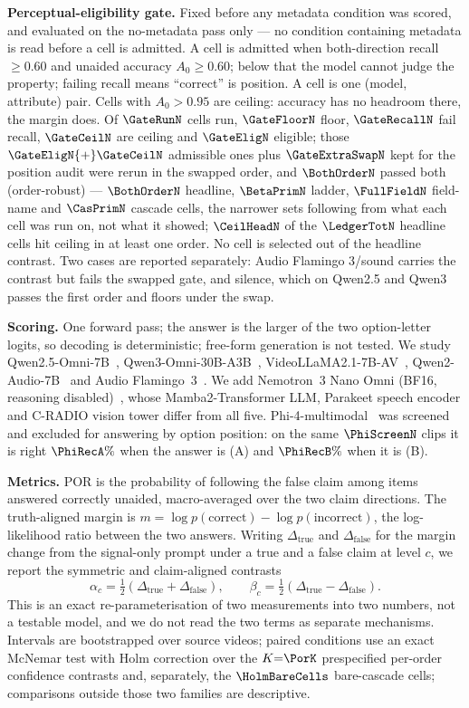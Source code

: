 \noindent\textbf{Perceptual-eligibility gate.} Fixed before any metadata condition was
scored, and evaluated on the
no-metadata pass only --- no condition containing metadata is read before a cell is
admitted. A cell is admitted when both-direction recall $\ge0.60$ and
unaided accuracy $A_0\ge0.60$; below that the model cannot judge the property; failing
recall means ``correct'' is position. A cell is one (model, attribute) pair. Cells with $A_0>0.95$ are ceiling: accuracy has no headroom
there, the margin does. Of $\GateRunN$ cells run, $\GateFloorN$ floor,
$\GateRecallN$ fail recall, $\GateCeilN$ are ceiling and $\GateEligN$ eligible; those
$\GateEligN{+}\GateCeilN$ admissible ones plus $\GateExtraSwapN$ kept for the position audit were
rerun in the swapped order, and $\BothOrderN$ passed both (order-robust) --- $\BothOrderN$ headline, $\BetaPrimN$
ladder, $\FullFieldN$ field-name and $\CasPrimN$ cascade cells, the narrower sets following from
what each cell was run on, not what it showed; $\CeilHeadN$ of the $\LedgerTotN$ headline cells hit ceiling in at least one order. No cell is selected out of the headline contrast. Two cases are
reported separately: Audio Flamingo 3/sound carries the contrast but fails the swapped gate, and
silence, which on Qwen2.5 and Qwen3 passes the first order and floors under the swap.

\noindent\textbf{Scoring.} One forward pass; the answer is the larger of the two option-letter
logits, so decoding is deterministic; free-form generation is not tested. We study
Qwen2.5-Omni-7B~\cite{qwen25omni}, Qwen3-\-Omni-\-30B-\-A3B~\cite{qwen3omni},
Video\-LLaMA2.1-\-7B-\-AV~\cite{cheng2024videollama2}, Qwen2-Audio-7B~\cite{qwen2audio} and Audio Flamingo~3~\cite{af3}. We add Nemotron~3 Nano Omni
(BF16, reasoning disabled)~\cite{nvidia2026nemotronomni}, whose Mamba2-\-Trans\-former LLM, Parakeet speech encoder and C-RADIO vision tower differ from all five. Phi-4-multi\-modal~\cite{phi4mm} was screened and excluded for answering by option position: on the same $\PhiScreenN$ clips it is right $\PhiRecA\%$ when the answer is (A) and $\PhiRecB\%$ when it is (B).



\noindent\textbf{Metrics.} POR is the probability of following the false claim among items
answered correctly unaided, macro-averaged over the two claim directions. The truth-aligned
margin is $m=\log p(\text{correct})-\log p(\text{incorrect})$, the log-likelihood ratio
between the two answers. Writing $\Delta_{\text{true}}$
and $\Delta_{\text{false}}$ for the margin change from the signal-only prompt under a true and a false claim at level $c$,
we report the symmetric and claim-aligned contrasts
\[
\alpha_c=\tfrac{1}{2}(\Delta_{\text{true}}+\Delta_{\text{false}}),\qquad
\beta_c=\tfrac{1}{2}(\Delta_{\text{true}}-\Delta_{\text{false}}).
\]
This is an exact re-parameterisation of two measurements into two numbers, not a testable
model, and we do not read the two terms as separate mechanisms. Intervals are bootstrapped over
source videos; paired conditions use an exact McNemar test with Holm
correction over the $K{=}\PorK$ prespecified per-order confidence contrasts and, separately,
the $\HolmBareCells$ bare-cascade cells; comparisons outside those two families are descriptive.

